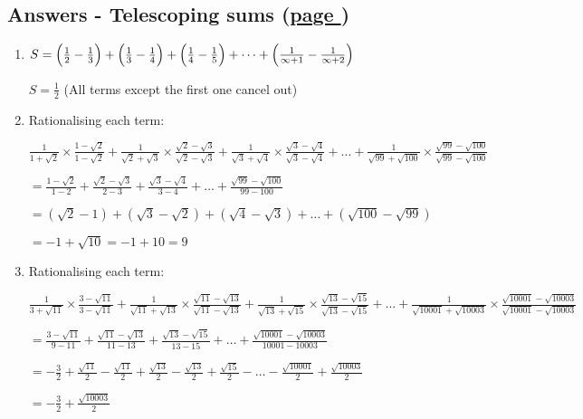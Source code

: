 \documentclass[../main.tex]{subfiles}
\begin{document}
\hypertarget{telescopingsumsanswers}{\subsection*{Answers - Telescoping sums (\hyperlink{telescopingsumslink}{page \pageref{telescoping sums}})}}

\label{Telescoping sums answers}
\begin{enumerate}[itemsep=0.7cm]
    \item 
    $S=\Bigl(\frac{1}{2}-\frac{1}{3}\Bigr)+\Bigl(\frac{1}{3}-\frac{1}{4}\Bigr)+\Bigl(\frac{1}{4}-\frac{1}{5}\Bigr)+\dots +\Bigl(\frac{1}{\infty +1}-\frac{1}{\infty +2}\Bigr)$

    $S=\frac{1}{2}$ (All terms except the first one cancel out)

    \item 
    Rationalising each term:

    $\frac{1}{1+\sqrt{2}}\times \frac{1-\sqrt{2}}{1-\sqrt{2}}+\frac{1}{\sqrt{2}+\sqrt{3}}\times \frac{\sqrt{2}-\sqrt{3}}{\sqrt{2}-\sqrt{3}}+\frac{1}{\sqrt{3}+\sqrt{4}}\times \frac{\sqrt{3}-\sqrt{4}}{\sqrt{3}-\sqrt{4}}+\dots +\frac{1}{\sqrt{99}+\sqrt{100}}\times \frac{\sqrt{99}-\sqrt{100}}{\sqrt{99}-\sqrt{100}}$

    $=\frac{1-\sqrt{2}}{1-2}+\frac{\sqrt{2}-\sqrt{3}}{2-3}+\frac{\sqrt{3}-\sqrt{4}}{3-4}+\dots +\frac{\sqrt{99}-\sqrt{100}}{99-100}$

    $=(\sqrt{2}-1)+(\sqrt{3}-\sqrt{2})+(\sqrt{4}-\sqrt{3})+\dots +(\sqrt{100}-\sqrt{99})$

    $=-1 + \sqrt{10}=-1+10=9$

    \item 
    Rationalising each term:

    $\frac{1}{3+\sqrt{11}}\times \frac{3-\sqrt{11}}{3-\sqrt{11}}+\frac{1}{\sqrt{11}+\sqrt{13}}\times \frac{\sqrt{11}-\sqrt{13}}{\sqrt{11}-\sqrt{13}}+\frac{1}{\sqrt{13}+\sqrt{15}}\times \frac{\sqrt{13}-\sqrt{15}}{\sqrt{13}-\sqrt{15}}+\dots +\frac{1}{\sqrt{10001}+\sqrt{10003}}\times \frac{\sqrt{10001}-\sqrt{10003}}{\sqrt{10001}-\sqrt{10003}}$

    $=\frac{3-\sqrt{11}}{9-11}+\frac{\sqrt{11}-\sqrt{13}}{11-13}+\frac{\sqrt{13}-\sqrt{15}}{13-15}+\dots +\frac{\sqrt{10001}-\sqrt{10003}}{10001-10003}$

    $=-\frac{3}{2}+\frac{\sqrt{11}}{2}-\frac{\sqrt{11}}{2}+\frac{\sqrt{13}}{2}-\frac{\sqrt{13}}{2}+\frac{\sqrt{15}}{2}-\dots -\frac{\sqrt{10001}}{2}+\frac{\sqrt{10003}}{2}$

    $=-\frac{3}{2}+\frac{\sqrt{10003}}{2}$


\end{enumerate}
\end{document}

